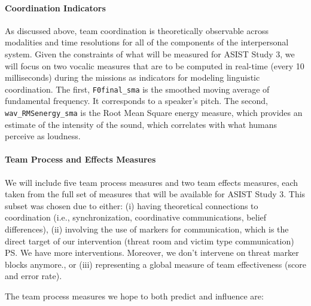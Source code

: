 \paragraph{Coordination Indicators} As discussed above, team coordination is
theoretically observable across modalities and time resolutions for all of the
components of the interpersonal system. Given the constraints of what will be
measured for ASIST Study 3, we will focus on two vocalic measures that are to
be computed in real-time (every 10 milliseconds) during the missions as
indicators for modeling linguistic coordination. The first,
\texttt{F0final\_sma} is the smoothed moving average of fundamental frequency.
It corresponds to a speaker’s pitch.  The second, \texttt{wav\_RMSenergy\_sma}
is the Root Mean Square energy measure, which provides an estimate of the
intensity of the sound, which correlates with what humans perceive as loudness. 

\paragraph{Team Process and Effects Measures} We will include five team process
measures and two team effects measures, each taken from the full set of
measures that will be available for ASIST Study 3. This subset was chosen due
to either: (i) having theoretical connections to coordination (i.e.,
synchronization, coordinative communications, belief differences), (ii)
involving the use of markers for communication, which is the direct target of
our intervention (threat room and victim type communication) \ps{We have more interventions. Moreover, we don't intervene on threat marker blocks anymore.}, or (iii)
representing a global measure of team effectiveness (score and error rate).

\noindent The team process measures we hope to both predict and influence are:

